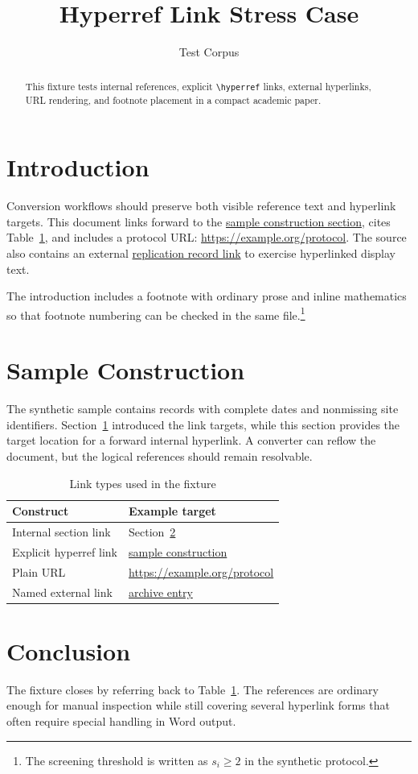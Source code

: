 \documentclass[11pt]{article}
\title{Hyperref Link Stress Case}
\author{Test Corpus}
\date{}
\begin{document}
\maketitle

\begin{abstract}
This fixture tests internal references, explicit \texttt{\textbackslash hyperref}
links, external hyperlinks, URL rendering, and footnote placement in a compact
academic paper.
\end{abstract}

\section{Introduction}
\label{sec:introduction}

Conversion workflows should preserve both visible reference text and hyperlink
targets. This document links forward to the \hyperref[sec:sample]{sample
construction section}, cites Table~\ref{tab:links}, and includes a protocol URL:
\url{https://example.org/protocol}. The source also contains an external
\href{https://doi.org/10.0000/example}{replication record link} to exercise
hyperlinked display text.

The introduction includes a footnote with ordinary prose and inline mathematics
so that footnote numbering can be checked in the same file.\footnote{The
screening threshold is written as $s_i \geq 2$ in the synthetic protocol.}

\section{Sample Construction}
\label{sec:sample}

The synthetic sample contains records with complete dates and nonmissing site
identifiers. Section~\ref{sec:introduction} introduced the link targets, while
this section provides the target location for a forward internal hyperlink. A
converter can reflow the document, but the logical references should remain
resolvable.

\begin{table}[htbp]
\centering
\caption{Link types used in the fixture}
\label{tab:links}
\begin{tabular}{ll}
\toprule
Construct & Example target \\
\midrule
Internal section link & Section~\ref{sec:sample} \\
Explicit hyperref link & \hyperref[sec:sample]{sample construction} \\
Plain URL & \url{https://example.org/protocol} \\
Named external link & \href{https://example.org/archive}{archive entry} \\
\bottomrule
\end{tabular}
\end{table}

\section{Conclusion}
\label{sec:conclusion}

The fixture closes by referring back to Table~\ref{tab:links}. The references are
ordinary enough for manual inspection while still covering several hyperlink
forms that often require special handling in Word output.
\end{document}
